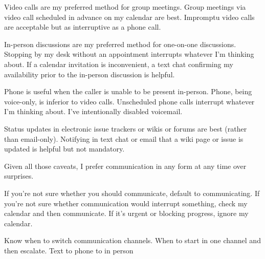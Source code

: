Video calls are my preferred method for group meetings. Group meetings via video call scheduled in advance on my calendar are best. Impromptu video calls are acceptable but as interruptive as a phone call. 

In-person discussions are my preferred method for one-on-one discussions. Stopping by my desk  without an appointment interrupts whatever I'm thinking about. If a calendar invitation is inconvenient, a text chat confirming my availability prior to the in-person discussion is helpful. 

Phone is useful when the caller is unable to be present in-person. Phone, being voice-only, is inferior to video calls. Unscheduled phone calls interrupt whatever I'm thinking about. I've intentionally disabled voicemail. 

Status updates in electronic issue trackers or wikis or forums are best (rather than email-only). Notifying in text chat or email that a wiki page or issue is updated is helpful but not mandatory. 

Given all those caveats, I prefer communication in any form at any time over surprises. 

If you're not sure whether you should communicate, default to communicating. If you're not sure whether communication would interrupt something, check my calendar and then communicate. If it's urgent or blocking progress, ignore my calendar. 

Know when to switch communication channels. When to start in one channel and then escalate. Text to phone to in person 
